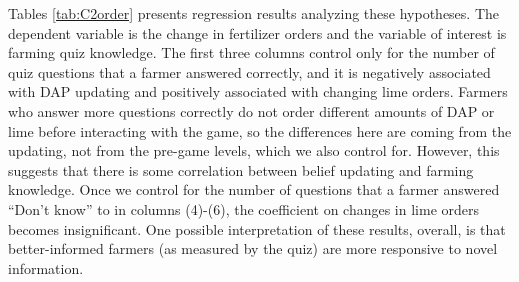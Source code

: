 \documentclass[12pt,letterpaper]{article}
\begin{document}
Tables \ref{tab:C2order} presents regression results analyzing these hypotheses. The dependent variable is the change in fertilizer orders and the variable of interest is farming quiz knowledge. The first three columns control only for the number of quiz questions that a farmer answered correctly, and it is negatively associated with DAP updating and positively associated with changing lime orders. Farmers who answer more questions correctly do not order different amounts of DAP or lime before interacting with the game, so the differences here are coming from the updating, not from the pre-game levels, which we also control for. However, this suggests that there is some correlation between belief updating and farming knowledge. Once we control for the number of questions that a farmer answered ``Don't know'' to in columns (4)-(6), the coefficient on changes in lime orders becomes insignificant. One possible interpretation of these results, overall, is that better-informed farmers (as measured by the quiz) are more responsive to novel information.

% 
 
\end{document}
